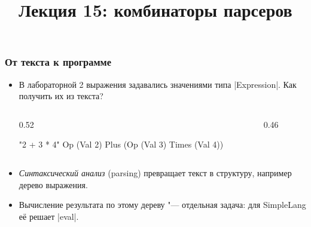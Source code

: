 \documentclass[11pt]{beamer}
\title{Лекция 15: комбинаторы парсеров}
\begin{document}
\begin{frame}[plain]
  \maketitle
\end{frame}

\begin{frame}[fragile]
  \frametitle{От текста к программе}
  \begin{itemize}
    \item В лабораторной 2 выражения задавались значениями типа \haskinline|Expression|. Как получить их из текста?
      \begin{columns}[c,onlytextwidth]
        \begin{column}{0.52\linewidth}
          \begin{haskellsmall}
            "2 + 3 * 4"
            Op (Val 2) Plus
               (Op (Val 3) Times (Val 4))
          \end{haskellsmall}
        \end{column}
        \begin{column}{0.46\linewidth}
          \centering
        \end{column}
      \end{columns}
      \pause
    \item \emph{Синтаксический анализ} (parsing) превращает текст в структуру, например дерево выражения.
    \item Вычисление результата по этому дереву "--- отдельная задача: для SimpleLang её решает \haskinline|eval|.
  \end{itemize}
\end{frame}
\end{document}
